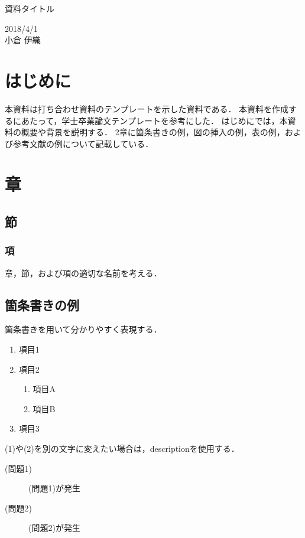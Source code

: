 \documentclass[12pt]{jsarticle}
\begin{document}
\begin{center}
{\LARGE 資料タイトル}
\end{center}

\begin{flushright}
  2018/4/1\\
  小倉 伊織
\end{flushright}
\section{はじめに}
\label{sec:introduction}
本資料は打ち合わせ資料のテンプレートを示した資料である．
本資料を作成するにあたって，学士卒業論文テンプレートを参考にした．
はじめにでは，本資料の概要や背景を説明する．
2章に箇条書きの例，図の挿入の例，表の例，および参考文献の例について記載している．


\section{章}\label{sec:hoge}
\subsection{節}\label{subsec:hoge}
\subsubsection{項}\label{subsubsec:hoge}

章，節，および項の適切な名前を考える．

\subsection{箇条書きの例}
箇条書きを用いて分かりやすく表現する．
\begin{enumerate}
\item 項目1
\item 項目2
  \begin{enumerate}
  \item 項目A
  \item 項目B
  \end{enumerate}
\item 項目3
\end{enumerate}

(1)や(2)を別の文字に変えたい場合は，descriptionを使用する．
\begin{description}
\item[(問題1)] (問題1)が発生
\item[(問題2)] (問題2)が発生
\end{description}
\end{document}
